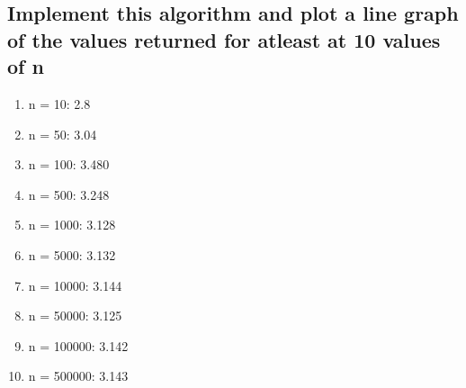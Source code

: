 \documentclass[10pt,letterpaper]{article}
\begin{document}
\subsection{Implement this algorithm and plot a line graph of the values returned for atleast at 10 values of n}
\begin{enumerate}
  \item n = 10:  2.8
  \item n = 50: 3.04
  \item n = 100: 3.480
  \item n = 500: 3.248
  \item n = 1000: 3.128
  \item n = 5000: 3.132
  \item n = 10000: 3.144
  \item n = 50000: 3.125
  \item n = 100000: 3.142
  \item n = 500000: 3.143 
\end{enumerate}
\end{document}
